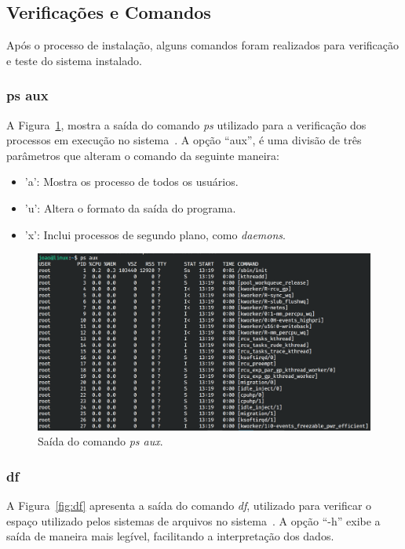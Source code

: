 \documentclass[
	12pt,				%
	oneside,   	        %
	a4paper,			%
	english,			%
	french,				%
	spanish,			%
	brazil,				%
	]{pacotes/abntex2}
\begin{document}
\subsection{Verificações e Comandos}
\label{subsec:verificacao}

Após o processo de instalação, alguns comandos foram realizados para verificação e teste do sistema instalado.

\subsubsection{ps aux}
A Figura~\ref{fig:ps}, mostra a saída do comando \textit{ps} utilizado para a verificação dos processos em execução no sistema~\cite{manPs}. A opção ``aux'', é uma divisão de três parâmetros que alteram o comando da seguinte maneira:

\begin{itemize}
    \item 'a': Mostra os processo de todos os usuários.
    
    \item 'u': Altera o formato da saída do programa.
    
    \item 'x': Inclui processos de segundo plano, como \textit{daemons}.
\end{itemize}

\begin{figure}[H]
  \centering
  \includegraphics[scale=0.37]{figuras/ps_aux.png}
  \caption{Saída do comando \textit{ps aux}.}
  \label{fig:ps}
\end{figure}

\subsubsection{df}
A Figura~\ref{fig:df} apresenta a saída do comando \textit{df}, utilizado para verificar o espaço utilizado pelos sistemas de arquivos no sistema~\cite{manDf}. A opção ``-h'' exibe a saída de maneira mais legível, facilitando a interpretação dos dados.
\end{document}
